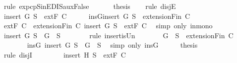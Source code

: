 \begin{isabellebody}
\ {\isacharparenleft}rule\ ex{}{\isacharunderscore}pcp{\isacharunderscore}SinE{\isacharunderscore}DIS{\isacharunderscore}auxFalse{\isacharparenright}\isanewline
\ \ \isamarkupfalse%
\isanewline
\ \ \isamarkupfalse%
\ {\isacharquery}thesis\isanewline
\ \ \isamarkupfalse%
\ {\isacharparenleft}rule\ disjE{\isacharparenright}\isanewline
\ \ \ \ \isamarkupfalse%
\ {\isachardoublequoteopen}insert\ G\ S\ {\isasymin}\ {\isacharparenleft}extF\ C{\isacharparenright}{\isachardoublequoteclose}\isanewline
\ \ \ \ \isamarkupfalse%
\ insG{\isacharcolon}{\isachardoublequoteopen}insert\ G\ S\ {\isasymin}\ {\isacharparenleft}extensionFin\ C{\isacharparenright}{\isachardoublequoteclose}\isanewline
\ \ \ \ \ \ \isamarkupfalse%
\ {\isacartoucheopen}{\isacharparenleft}extF\ C{\isacharparenright}\ {\isasymsubseteq}\ {\isacharparenleft}extensionFin\ C{\isacharparenright}{\isacartoucheclose}\ {\isacartoucheopen}insert\ G\ S\ {\isasymin}\ {\isacharparenleft}extF\ C{\isacharparenright}{\isacartoucheclose}\ \isamarkupfalse%
\ {\isacharparenleft}simp\ only{\isacharcolon}\ in{\isacharunderscore}mono{\isacharparenright}\isanewline
\ \ \ \ \isamarkupfalse%
\ {\isachardoublequoteopen}insert\ G\ S\ {\isacharequal}\ {\isacharbraceleft}G{\isacharbraceright}\ {\isasymunion}\ S{\isachardoublequoteclose}\isanewline
\ \ \ \ \ \ \isamarkupfalse%
\ {\isacharparenleft}rule\ insert{\isacharunderscore}is{\isacharunderscore}Un{\isacharparenright}\isanewline
\ \ \ \ \isamarkupfalse%
\ \isamarkupfalse%
\ {\isachardoublequoteopen}{\isacharbraceleft}G{\isacharbraceright}\ {\isasymunion}\ S\ {\isasymin}\ {\isacharparenleft}extensionFin\ C{\isacharparenright}{\isachardoublequoteclose}\isanewline
\ \ \ \ \ \ \isamarkupfalse%
\ insG\ {\isacartoucheopen}insert\ G\ S\ {\isacharequal}\ {\isacharbraceleft}G{\isacharbraceright}\ {\isasymunion}\ S{\isacartoucheclose}\ \isamarkupfalse%
\ {\isacharparenleft}simp\ only{\isacharcolon}\ insG{\isacharparenright}\isanewline
\ \ \ \ \isamarkupfalse%
\ {\isacharquery}thesis\isanewline
\ \ \ \ \ \ \isamarkupfalse%
\ {\isacharparenleft}rule\ disjI{}{\isacharparenright}\isanewline
\ \ \isamarkupfalse%
\isanewline
\ \ \ \ \isamarkupfalse%
\ {\isachardoublequoteopen}insert\ H\ S\ {\isasymin}\ {\isacharparenleft}extF\ C{\isacharparenright}{\isachardoublequoteclose}\isanewline

\end{isabellebody}
